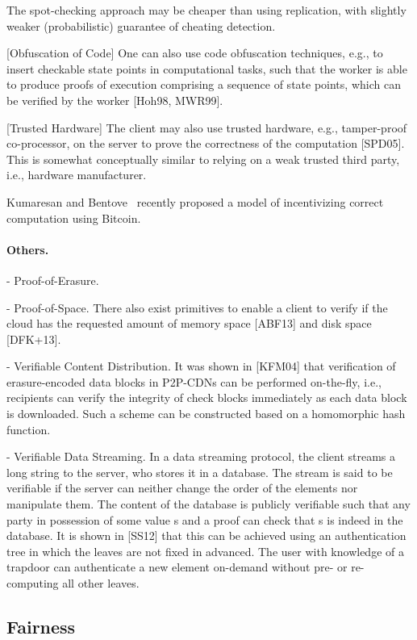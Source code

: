 The spot-checking approach may be cheaper than using replication, with slightly weaker (probabilistic) guarantee of cheating detection.

[Obfuscation of Code]
One can also use code obfuscation techniques, e.g., to insert checkable state points in computational tasks, such that the worker is able to produce proofs of execution comprising a sequence of state points, which can be verified by the worker [Hoh98, MWR99].

[Trusted Hardware]
The client may also use trusted hardware, e.g., tamper-proof co-processor, on the server to prove the correctness of the computation [SPD05]. This is somewhat conceptually similar to relying on a weak trusted third party, i.e., hardware manufacturer.

Kumaresan and Bentove~\cite{KB14} recently proposed a model of incentivizing correct computation using Bitcoin. 


\paragraph{Others.}

- Proof-of-Erasure.

- Proof-of-Space.
There also exist primitives to enable a client to verify if the cloud has the requested amount of memory space [ABF13] and disk space [DFK+13].

- Verifiable Content Distribution. It was shown in [KFM04] that verification of erasure-encoded data blocks in P2P-CDNs can be performed on-the-fly, i.e., recipients can verify the integrity of check blocks immediately as each data block is downloaded. Such a scheme can be constructed based on a homomorphic hash function.

- Verifiable Data Streaming. In a data streaming protocol, the client streams a long string to the server, who stores it in a database. The stream is said to be verifiable if the server can neither change the order of the elements nor manipulate them. The content of the database is publicly verifiable such that any party in possession of some value s and a proof can check that s is indeed in the database. It is shown in [SS12] that this can be achieved using an authentication tree in which the leaves are not fixed in advanced. The user with knowledge of a trapdoor can authenticate a new element on-demand without pre- or re-computing all other leaves.


\subsection{Fairness}
